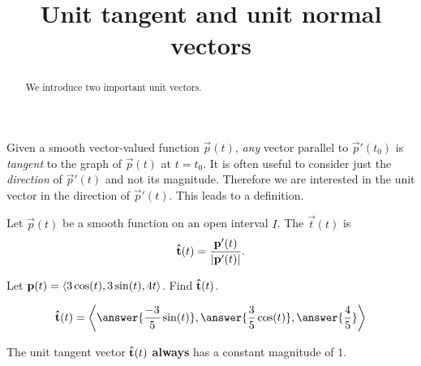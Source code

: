 \documentclass{ximera}
\title[Dig-In:]{Unit tangent and unit normal vectors}
\begin{document}
\begin{abstract}
  We introduce two important unit vectors. 
\end{abstract}
\maketitle


Given a smooth vector-valued function $\vec{p}(t)$, \textit{any}
vector parallel to $\vec{p}'(t_0)$ is \textit{tangent} to the graph of
$\vec{p}(t)$ at $t=t_0$. It is often useful to consider just the
\textit{direction} of $\vec{p}'(t)$ and not its magnitude. Therefore we are
interested in the unit vector in the direction of $\vec{p}'(t)$. This
leads to a definition.
\begin{definition}
Let $\vec{p}(t)$ be a smooth function on an open interval $I$. The
 $\vec{t}(t)$ is  
\[
\mathbf{\hat{t}}(t) = \frac{\mathbf{p}'(t)}{|\mathbf{p}'(t)|}.
\]
\end{definition}

\begin{question}
  Let $\mathbf{p}(t) = \left\langle 3\cos(t), 3\sin(t), 4t\right\rangle$. Find $\mathbf{\hat{t}}(t)$.
  \begin{prompt}
    \[
    \utan(t) = \vector{\answer{\frac{-3}{5}\sin(t)},\answer{\frac{3}{5}\cos(t)},\answer{\frac{4}{5}}}
    \]
    \begin{feedback}
      The unit tangent vector $\mathbf{\hat{t}}(t)$ \textbf{always} has a constant
      magnitude of $1$.
    \end{feedback}
  \end{prompt}
\end{question}
\end{document}
